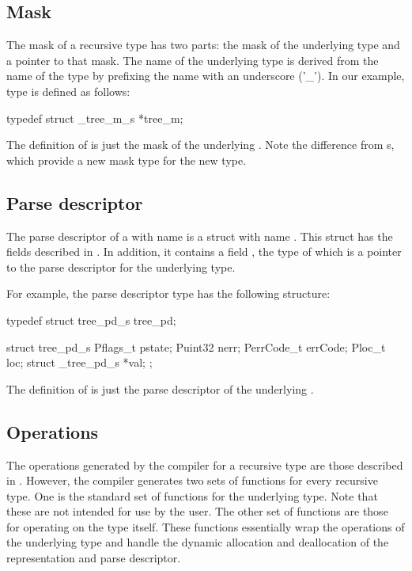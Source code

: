 \subsection{Mask}
\label{sec:recur-masks}
The mask of a recursive type has two parts: the
mask of the underlying type and a pointer to that
mask. The name of the underlying type is derived from the
name of the type by prefixing the name with an underscore ('\_'). In
our example, type  is defined as follows:

\begin{code}
typedef struct _tree_m_s  *tree_m;
\end{code}

The definition of  is just the mask of the
underlying \Punion{}.  Note the difference from \ptypedef{}s, which
provide a new mask type for the new type.

\subsection{Parse descriptor}
\label{sec:recur-parse-descriptors}
The parse descriptor of a \Precur{} with name  is a \C{}
struct with name .  This struct has the fields
described in . In addition, it
contains a field , the type of which is a pointer to the parse
descriptor for the underlying type.

For example, the parse descriptor type  has
the following structure:

\begin{code}
typedef struct tree_pd_s tree_pd;

struct tree_pd_s {
  Pflags_t pstate;
  Puint32 nerr;
  PerrCode_t errCode;
  Ploc_t loc;
  struct _tree_pd_s *val;
};
\end{code}

The definition of  is just the parse
descriptor of the underlying \Punion{}.

\subsection{Operations}
The operations generated by the \pads{} compiler for a recursive type
are those described in . However, the
compiler generates two sets of functions for every recursive type. One
is the standard set of functions for the underlying type. Note that
these are not intended for use by the user.  The other set of
functions are those for operating on the type itself. These functions
essentially wrap the operations of the underlying type and handle the
dynamic allocation and deallocation of the representation and parse
descriptor.

